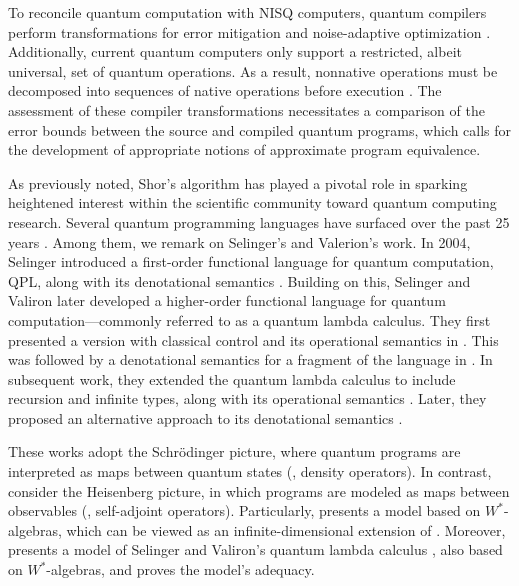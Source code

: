 To reconcile quantum computation with NISQ computers, quantum compilers perform transformations for error mitigation \cite{wallman2016noise} and noise-adaptive optimization \cite{murali2019noise}. Additionally, current quantum computers only support a restricted, albeit universal, set of quantum operations. As a result, nonnative operations must be decomposed into sequences of native operations before execution \cite{harrow2002efficient,burgholzer2020advanced}. The assessment of these compiler transformations necessitates a comparison of the error bounds between the source and compiled quantum programs, which calls  for the development of appropriate notions of approximate program equivalence.


As previously noted, Shor's algorithm has played a pivotal role in sparking heightened interest within the scientific community toward quantum computing research. Several quantum programming languages have surfaced over the past 25 years \cite{zhao2020quantum,serrano2022quantum}. Among them, we remark on Selinger's and Valerion's work. In 2004, Selinger introduced a first-order functional language for quantum computation, QPL, along with its denotational semantics \cite{selinger2004towards}. Building on this, Selinger and Valiron later developed a higher-order functional language for quantum computation—commonly referred to as a quantum lambda calculus. They first presented a version with classical control and its operational semantics in \cite{selinger2006lambda}. This was followed by a denotational semantics for a fragment of the language in \cite{selinger2008fully}. In subsequent work, they extended the quantum lambda calculus to include recursion and infinite types, along with its operational semantics \cite{selinger2009quantum}. Later, they proposed an alternative approach to its denotational semantics \cite{selinger2014}.


These works adopt the Schr\"odinger picture, where quantum programs are interpreted as maps between quantum states (\ie, density operators). In contrast, \cite{choSemanticsQuantumProgramming2016, choNeumannAlgebrasForm2016} consider the Heisenberg picture, in which programs are modeled as maps between observables (\ie, self-adjoint operators). Particularly, \cite{choSemanticsQuantumProgramming2016} presents a model based on $W^*$-algebras, which can be viewed as an infinite-dimensional extension of \cite{selinger2004towards}. Moreover, \cite{choSemanticsQuantumProgramming2016} presents a model of Selinger and Valiron’s quantum lambda calculus \cite{selinger2006lambda, selinger2008linear, selinger2009quantum}, also based on $W^*$-algebras, and proves the model's adequacy.


